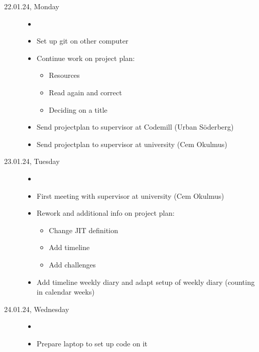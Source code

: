 \documentclass[a4, 11pt]{scrartcl}
\begin{document}
\begin{description}


\item[22.01.24, Monday]
\begin{itemize}
	\item[]
	\item Set up git on other computer
		\item Continue work on project plan:
	\begin{itemize}
		\item Resources
		\item Read again and correct
		\item Deciding on a title
	\end{itemize}
	\item Send projectplan to supervisor at Codemill (Urban Söderberg)
	\item Send projectplan to supervisor at university (Cem Okulmus)
\end{itemize}







\item[23.01.24, Tuesday]
\begin{itemize}
	\item[]
	\item First meeting with supervisor at university (Cem Okulmus)
	\item Rework and additional info on project plan:
	\begin{itemize}
		\item Change JIT definition
		\item Add timeline
		\item Add challenges
	\end{itemize}
	\item Add timeline weekly diary and adapt setup of weekly diary (counting in calendar weeks)
\end{itemize}








\item[24.01.24, Wednesday]
\begin{itemize}
	\item[]
	\item Prepare laptop to set up code on it
\end{itemize}
















\end{description}
\end{document}
